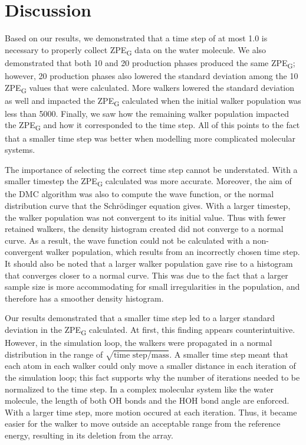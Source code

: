 \documentclass[journal=jacsat,manuscript=article]{achemso}
\begin{document}
\section{Discussion}

Based on our results, we demonstrated that a time step of at most 1.0 is necessary to properly collect ZPE\textsubscript{G} data on the water molecule. We also demonstrated that both 10 and 20 production phases produced the same ZPE\textsubscript{G}; however, 20 production phases also lowered the standard deviation among the 10 ZPE\textsubscript{G} values that were calculated. More walkers lowered the standard deviation as well and impacted the ZPE\textsubscript{G} calculated when the initial walker population was less than 5000. Finally, we saw how the remaining walker population impacted the ZPE\textsubscript{G} and how it corresponded to the time step. All of this points to the fact that a smaller time step was better when modelling more complicated molecular systems. 

The importance of selecting the correct time step cannot be understated. With a smaller timestep the ZPE\textsubscript{G} calculated was more accurate. Moreover, the aim of the DMC algorithm was also to compute the wave function, or the normal distribution curve that the Schr\"odinger equation gives. With a larger timestep, the walker population was not convergent to its initial value. Thus with fewer retained walkers, the density histogram created did not converge to a normal curve. As a result, the wave function could not be calculated with a non-convergent walker population, which results from an incorrectly chosen time step. It should also be noted that a larger walker population gave rise to a histogram that converges closer to a normal curve. This was due to the fact that a larger sample size is more accommodating for small irregularities in the population, and therefore has a smoother density histogram. 

Our results demonstrated that a smaller time step led to a larger standard deviation in the ZPE\textsubscript{G} calculated. At first, this finding appears counterintuitive. However, in the simulation loop, the walkers were propagated in a normal distribution in the range of $\sqrt{\text{time step}/\text{mass}}$. A smaller time step meant that each atom in each walker could only move a smaller distance in each iteration of the simulation loop; this fact supports why the number of iterations needed to be normalized to the time step. In a complex molecular system like the water molecule, the length of both OH bonds and the HOH bond angle are enforced. With a larger time step, more motion occured at each iteration. Thus, it became easier for the walker to move outside an acceptable range from the reference energy, resulting in its deletion from the array. 
\end{document}
